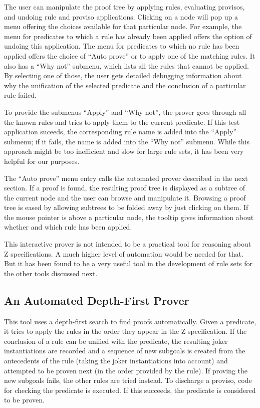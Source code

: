 \documentclass{entcs}
\begin{document}
The user can manipulate the proof tree by applying rules, evaluating
provisos, and undoing rule and proviso applications.  Clicking on a
node will pop up a menu offering the choices available for that
particular node.  For example, the menu for predicates to which a rule
has already been applied offers the option of undoing this
application.  The menu for predicates to which no rule has been
applied offers the choice of ``Auto prove'' or to apply one of the
matching rules.  It also has a ``Why not'' submenu, which lists all
the rules that cannot be applied.  By selecting one of those, the user
gets detailed debugging information about why the unification of the
selected predicate and the conclusion of a particular rule failed.

To provide the submenus ``Apply'' and ``Why not'', the prover goes
through all the known rules and tries to apply them to the current
predicate.  If this test application suceeds, the corresponding rule
name is added into the ``Apply'' submenu; if it fails, the name is
added into the ``Why not'' submenu.  While this approach might be too
inefficient and slow for large rule sets, it has been very helpful for
our purposes.

The ``Auto prove'' menu entry calls the automated prover described in
the next section.  If a proof is found, the resulting proof tree is
displayed as a subtree of the current node and the user can browse and
manipulate it.  Browsing a proof tree is eased by allowing subtrees to
be folded away by just clicking on them.  If the mouse pointer is
above a particular node, the tooltip gives information about whether
and which rule has been applied.

This interactive prover is not intended to be a practical tool for
reasoning about Z specifications.  A much higher level of automation
would be needed for that.  But it has been found to be a very useful
tool in the development of rule sets for the other tools discussed
next.

\subsection{An Automated Depth-First Prover} \label{sec:prover}

This tool uses a depth-first search to find proofs automatically.
Given a predicate, it tries to apply the rules in the order they
appear in the Z specification.  If the conclusion of a rule can be
unified with the predicate, the resulting joker instantiations are
recorded and a sequence of new subgoals is created from the
antecedents of the rule (taking the joker instantiations into account)
and attempted to be proven next (in the order provided by the rule).
If proving the new subgoals fails, the other rules are tried instead.
To discharge a proviso, code for checking the predicate is executed.
If this succeeds, the predicate is considered to be proven.
\end{document}
